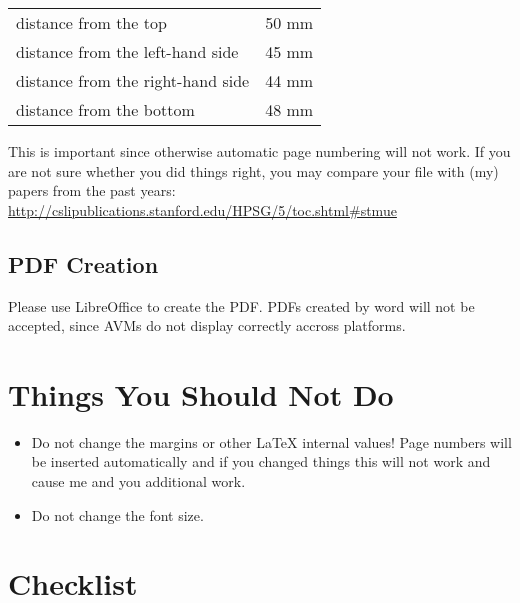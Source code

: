 \documentclass[11pt,a4paper,fleqn]{article}
\begin{document}
\begin{table}[H]
\begin{tabular}{@{}l@{ = }l}
distance from the top & 50 mm\\
distance from the left-hand side & 45 mm\\
distance from the right-hand side & 44 mm\\
distance from the bottom & 48 mm\\
\end{tabular}
\end{table}

This is important since otherwise automatic page numbering will not work.
If you are not sure whether you did things right, you may compare your file
with (my) papers from the past years:\newline 
\url{http://cslipublications.stanford.edu/HPSG/5/toc.shtml#stmue}

\subsection{PDF Creation}

Please use LibreOffice to create the PDF. PDFs created by word will not be accepted, since AVMs do
not display correctly accross platforms.

\section{Things You Should Not Do}

\begin{itemize}
\item Do not change the margins or other \LaTeX{} internal values! Page numbers will be inserted automatically and
      if you changed things this will not work and cause me and you additional work.
\item Do not change the font size.
\end{itemize}


\section{Checklist}
\end{document}
